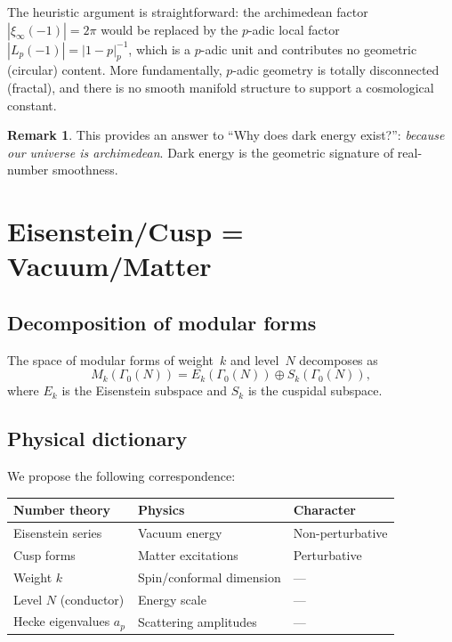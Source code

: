 \documentclass[12pt,a4paper]{article}
\theoremstyle{definition}
\newtheorem{remark}[theorem]{Remark}
\begin{document}
The heuristic argument is straightforward:
the archimedean factor $|\xi_\infty(-1)|=2\pi$
would be replaced by the $p$-adic local factor
$|L_p(-1)|=|1-p|_p^{-1}$, which is a $p$-adic unit
and contributes no geometric (circular) content.
More fundamentally, $p$-adic geometry is totally disconnected
(fractal), and there is no smooth manifold structure to
support a cosmological constant.

\begin{remark}
This provides an answer to ``Why does dark energy exist?'':
\emph{because our universe is archimedean}.
Dark energy is the geometric signature of real-number smoothness.
\end{remark}

\section{Eisenstein/Cusp = Vacuum/Matter}\label{sec:eisenstein_cusp}

\subsection{Decomposition of modular forms}

The space of modular forms of weight~$k$ and level~$N$ decomposes as
\begin{equation}
  M_k(\Gamma_0(N)) = E_k(\Gamma_0(N)) \oplus S_k(\Gamma_0(N)),
\end{equation}
where $E_k$ is the Eisenstein subspace and $S_k$ is the cuspidal subspace.

\subsection{Physical dictionary}

We propose the following correspondence:

\begin{center}
\begin{tabular}{lll}
\toprule
Number theory & Physics & Character \\
\midrule
Eisenstein series & Vacuum energy & Non-perturbative \\
Cusp forms & Matter excitations & Perturbative \\
Weight $k$ & Spin/conformal dimension & --- \\
Level $N$ (conductor) & Energy scale & --- \\
Hecke eigenvalues $a_p$ & Scattering amplitudes & --- \\
\bottomrule
\end{tabular}
\end{center}
\end{document}
